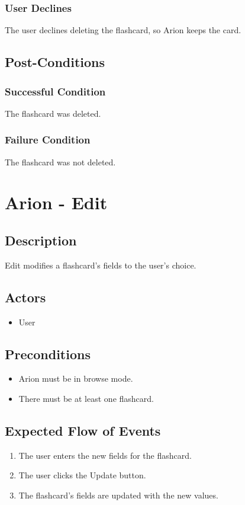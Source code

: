 \documentclass{scrreprt}
\begin{document}
    \subsection{User Declines}
    The user declines deleting the flashcard, so Arion keeps the card.

\section{Post-Conditions}
    \subsection{Successful Condition}
    The flashcard was deleted.
    
    \subsection{Failure Condition}
    The flashcard was not deleted.


\chapter{Arion - Edit}

\section{Description}
Edit modifies a flashcard's fields to the user's choice.

\section{Actors}
\begin{itemize}
    \item User
\end{itemize}

\section{Preconditions}
\begin{itemize}
    \item Arion must be in browse mode.
    \item There must be at least one flashcard.
\end{itemize}

\section{Expected Flow of Events}
\begin{enumerate}[1.]
    \item The user enters the new fields for the flashcard.
    \item The user clicks the Update button.
    \item The flashcard's fields are updated with the new values.
\end{enumerate}
\end{document}
